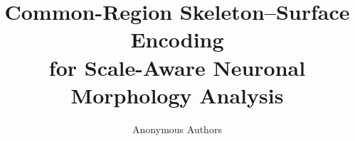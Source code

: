 \documentclass[10pt,twocolumn,letterpaper]{article}
\title{Common-Region Skeleton--Surface Encoding\\for Scale-Aware Neuronal Morphology Analysis}
\author{Anonymous Authors}
\begin{document}
\maketitle
    




{
    \small
    
    
}

% 
\end{document}
